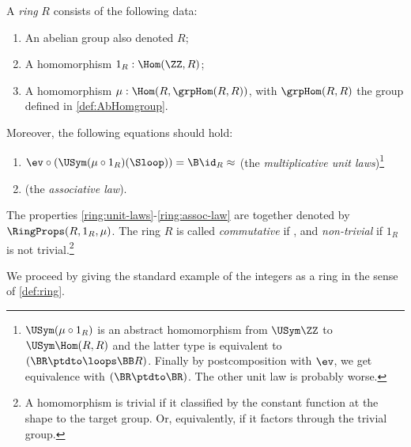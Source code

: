 \begin{definition}\label{def:ring}
A \emph{ring} $R$ consists of the following data:
\begin{enumerate}
\item An abelian group also denoted $R$;
\item A homomorphism $1_R:\Hom(\ZZ,R)$;
\item A homomorphism $\mu: \Hom(R,\grpHom(R,R))$, with $\grpHom(R,R)$
the group defined in \cref{def:AbHomgroup}.
\end{enumerate}
Moreover, the following equations should hold:
    \begin{enumerate}
    \item\label{ring:unit-laws}
    $\ev\circ(\USym(\mu\circ{1_R})(\Sloop)) = \B\id_R \approx \MB{TBD}$ 
    (the \emph{multiplicative unit laws})\footnote{%
 $\USym(\mu\circ{1_R})$ is an abstract homomorphism
from $\USym\ZZ$ to $\USym\Hom(R,R)$ and the latter type
is equivalent to $(\BR\ptdto\loops\BB R)$. Finally by postcomposition
with $\ev$, we get equivalence with $(\BR\ptdto\BR)$.
The other unit law is probably worse.}
    \item\label{ring:assoc-law}  (the \emph{associative law}). %
    \end{enumerate}
The properties \ref{ring:unit-laws}-\ref{ring:assoc-law} 
are together denoted by $\RingProps(R,1_R,\mu)$.
The ring $R$ is called \emph{commutative} if , 
and \emph{non-trivial} if $1_R$ is not trivial.\footnote{%
A homomorphism is trivial if it classified by the constant function
at the shape to the target group. Or, equivalently, if it factors
through the trivial group.}
\end{definition}

We proceed by giving the standard example of the integers as a ring
in the sense of \cref{def:ring}.


